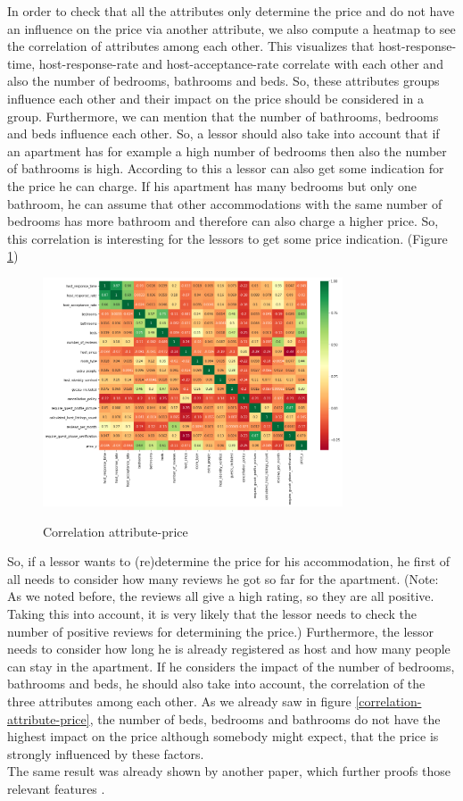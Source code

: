 In order to check that all the attributes only determine the price and do not have an influence on the price via another attribute, we also compute a heatmap to see the correlation of attributes among each other. This visualizes that host-response-time, host-response-rate and host-acceptance-rate correlate with each other and also the number of bedrooms, bathrooms and beds. So, these attributes groups influence each other and their impact on the price should be considered in a group. Furthermore, we can mention that the number of bathrooms, bedrooms and beds influence each other. So, a lessor should also take into account that if an apartment has for example a high number of bedrooms then also the number of bathrooms is high. According to this a lessor can also get some indication for the price he can charge. If his apartment has many bedrooms but only one bathroom, he can assume that other accommodations with the same number of bedrooms has more bathroom and therefore can also charge a higher price. So, this correlation is interesting for the lessors to get some price indication. (Figure \ref{heatmap })
\begin{figure}
  \begin{center}
  \includegraphics[width=3.5in]{photo/8_heatmap.png}\\
  \caption{Correlation attribute-price}\label{heatmap }
  \end{center}
\end{figure}
So, if a lessor wants to (re)determine the price for his accommodation, he first of all needs to consider how many reviews he got so far for the apartment. (Note: As we noted before, the reviews all give a high rating, so they are all positive. Taking this into account, it is very likely that the lessor needs to check the number of positive reviews for determining the price.) Furthermore, the lessor needs to consider how long he is already registered as host and how many people can stay in the apartment. If he considers the impact of the number of bedrooms, bathrooms and beds, he should also take into account, the correlation of the three attributes among each other.
As we already saw in figure \ref{correlation-attribute-price}, the number of beds, bedrooms and bathrooms do not have the highest impact on the price although somebody might expect, that the price is strongly influenced by these factors. \\
The same result was already shown by another paper, which further proofs those relevant features \cite{RN1}. 


